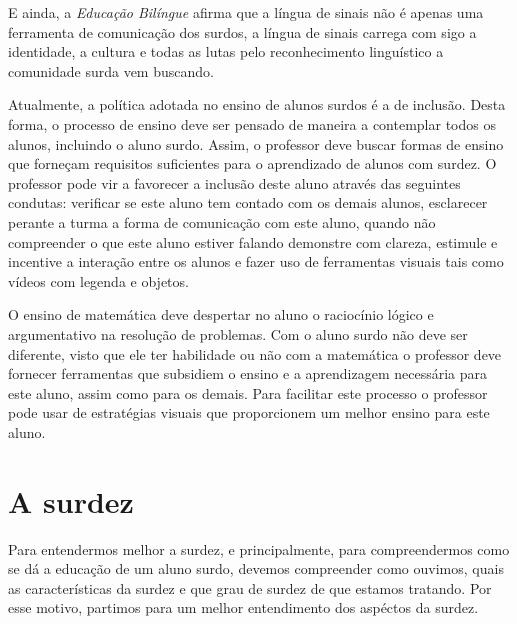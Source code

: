 \documentclass[brasil]{abnt}
\begin{document}
	E ainda, a \textit{Educação Bilíngue} afirma que a língua de sinais não é apenas uma ferramenta de comunicação dos surdos, a língua de sinais carrega com sigo a identidade, a cultura e todas as lutas pelo reconhecimento linguístico a comunidade surda vem buscando. 
	
	Atualmente, a política adotada no ensino de alunos surdos é a de inclusão. Desta forma, o processo de ensino deve ser pensado de maneira a contemplar todos os alunos, incluindo o aluno surdo. Assim, o professor deve buscar formas de ensino que forneçam requisitos suficientes para o aprendizado de alunos com surdez. O professor pode vir a favorecer a inclusão deste aluno através das seguintes condutas: verificar se este aluno tem contado com os demais alunos, esclarecer perante a turma a forma de comunicação com este aluno, quando não compreender o que este aluno estiver falando demonstre com clareza, estimule e incentive a interação entre os alunos e fazer uso de ferramentas 
	visuais tais como vídeos com legenda e objetos.        
	
	O ensino de matemática deve despertar no aluno o raciocínio lógico e argumentativo na resolução de problemas. Com o aluno surdo não deve ser diferente, visto que ele ter habilidade ou não com a matemática o professor deve fornecer ferramentas que subsidiem o ensino e a aprendizagem necessária para este aluno, assim como para os demais. Para facilitar este processo o professor pode usar de estratégias visuais que proporcionem um melhor ensino para este aluno. 
  
  

	\nocite{aud}
	\nocite{coch}
	\nocite{crist}
	\nocite{audi}
	\nocite{vs}
	\nocite{phs}
	\nocite{qes}
	\nocite{s}
	\nocite{fil}
	\nocite{bev}
	\nocite{bot}
	\nocite{l1}
	\nocite{l2}
	\nocite{l3}
	\nocite{l4}
	\nocite{l5}
	\nocite{l6}
	\nocite{capo}
	\nocite{car}
	\nocite{cr}
	\nocite{Ubi}
	\nocite{dec}
	\nocite{fa}
	\nocite{gold}
	\nocite{lacerd}
	\nocite{lei}
	\nocite{lip}
	\nocite{machado}
	\nocite{PC}
	\nocite{macha}
	\nocite{mm}
	\nocite{mon}
	\nocite{nogu}
	\nocite{nunes}
	\nocite{oliveira}
	\nocite{Paul}
	\nocite{jur}
	\nocite{pei}
	\nocite{crist}
	\nocite{quas}
	\nocite{qua}
	\nocite{qep}
	\nocite{quads}
	\nocite{rodr}
	\nocite{sado}
	\nocite{Sales}
	\nocite{sal}
	\nocite{san}
	\nocite{sp}
	\nocite{ei}
	\nocite{silva}
	\nocite{soares}
	\nocite{sou}
  
\anexo
\chapter{A surdez}
	Para entendermos melhor a surdez, e principalmente, para compreendermos como se dá a educação de um aluno surdo, devemos compreender como ouvimos, quais as características da surdez e 
	que grau de surdez de que estamos tratando. Por esse motivo, partimos para um melhor entendimento dos aspéctos da surdez.	
			
\end{document}
